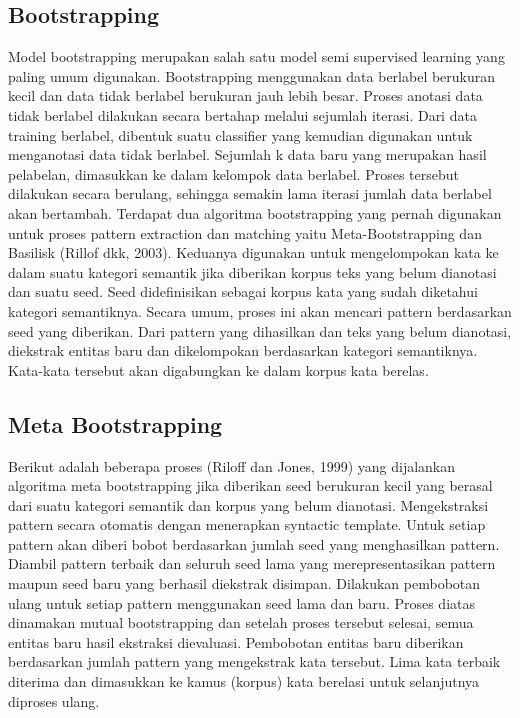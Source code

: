 \subsection{Bootstrapping}
Model bootstrapping merupakan salah satu model semi supervised learning yang paling umum digunakan. Bootstrapping menggunakan data berlabel berukuran kecil dan data tidak berlabel berukuran jauh lebih besar. Proses anotasi data tidak berlabel dilakukan secara bertahap melalui sejumlah iterasi. Dari data training berlabel, dibentuk suatu classifier yang kemudian digunakan untuk menganotasi data tidak berlabel. Sejumlah k data baru yang merupakan hasil pelabelan, dimasukkan ke dalam kelompok data berlabel. Proses tersebut dilakukan secara berulang, sehingga semakin lama iterasi jumlah data berlabel akan bertambah. 
Terdapat dua algoritma bootstrapping yang pernah digunakan untuk proses pattern extraction dan matching yaitu Meta-Bootstrapping dan Basilisk (Rillof dkk, 2003). Keduanya digunakan untuk mengelompokan kata ke dalam suatu kategori semantik jika diberikan korpus teks yang belum dianotasi dan suatu seed. Seed didefinisikan sebagai korpus kata yang sudah diketahui kategori semantiknya. Secara umum, proses ini akan mencari pattern berdasarkan seed yang diberikan. Dari pattern yang dihasilkan dan teks yang belum dianotasi, diekstrak entitas baru dan dikelompokan berdasarkan kategori semantiknya. Kata-kata tersebut akan digabungkan ke dalam korpus kata berelas.

\subsection{Meta Bootstrapping}
Berikut adalah beberapa proses (Riloff dan Jones, 1999) yang dijalankan algoritma meta bootstrapping jika diberikan seed berukuran kecil yang berasal dari suatu kategori semantik dan korpus yang belum dianotasi.
Mengekstraksi pattern secara otomatis dengan menerapkan syntactic template.
Untuk setiap pattern akan diberi bobot berdasarkan jumlah seed yang menghasilkan pattern.
Diambil pattern terbaik dan seluruh seed lama yang merepresentasikan pattern maupun seed baru yang berhasil diekstrak disimpan.
Dilakukan pembobotan ulang untuk setiap pattern menggunakan seed lama dan baru.
Proses diatas dinamakan mutual bootstrapping dan setelah proses tersebut selesai, semua entitas baru hasil ekstraksi dievaluasi. Pembobotan entitas baru diberikan berdasarkan jumlah pattern yang mengekstrak kata tersebut. Lima kata terbaik diterima dan dimasukkan ke kamus (korpus) kata berelasi untuk selanjutnya diproses ulang.

